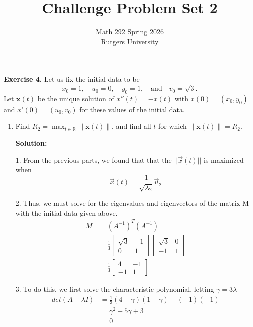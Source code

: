 \documentclass[12pt]{article}
\title{Challenge Problem Set 2}
\author{Math 292 Spring 2026 \\ Rutgers University}
\date{}
\begin{document}
\maketitle

\noindent \textbf{Exercise 4.} Let us fix the initial data to be
\[
    x_{0}=1, \quad u_{0}=0, \quad y_{0}=1, \quad \text{and} \quad v_{0}=\sqrt{3}.
\]
Let $\mathbf{x}(t)$ be the unique solution of $x''(t)=-x(t)$ with $x(0)=(x_{0},y_{0})$ and $x'(0)=(u_{0},v_{0})$ for these values of the initial data.

\begin{enumerate}

    \item[(a)] Find $R_{2}=\max_{t\in\mathbb{R}}\|\mathbf{x}(t)\|$, and find all $t$ for which $\|\mathbf{x}(t)\|=R_{2}$.

          \textbf{Solution:}

          1. From the previous parts, we found that that the $||\vec{x}(t)||$ is maximized when
          \[
              \vec{x}(t) = \frac{1}{\sqrt{\lambda{}_2}}\vec{u}_2
          \]

          2. Thus, we must solve for the eigenvalues and eigenvectors of the matrix M with the initial data given above.
          \begin{align*}
              M & = (A^{-1})^T(A^{-1})                                         \\
                & = \frac{1}{3}
              \begin{bmatrix} \sqrt{3} & -1 \\ 0 & 1 \end{bmatrix}
              \begin{bmatrix} \sqrt{3} & 0 \\ -1 & 1 \end{bmatrix}             \\
                & = \frac{1}{3} \begin{bmatrix} 4 & -1 \\ -1 & 1 \end{bmatrix}
          \end{align*}

          3. To do this, we first solve the characteristic polynomial, letting $\gamma{} = 3\lambda{}$
          \begin{align*}
              det(A - \lambda{}I) & = \frac{1}{3}(4-\gamma{})(1-\gamma{}) - (-1)(-1) \\
                                  & = \gamma{}^2 - 5\gamma{} + 3                     \\
                                  & = 0
          \end{align*}


\end{enumerate}
\end{document}
